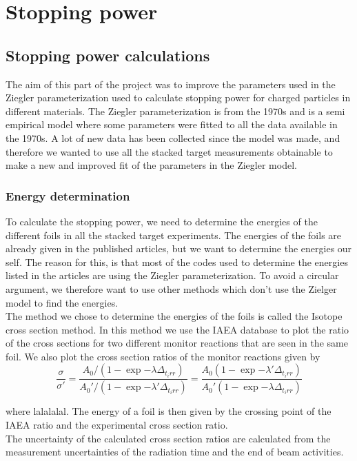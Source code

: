 \chapter{Stopping power}
\label{p1:stoppingpower}

\section{Stopping power calculations}
The aim of this part of the project was to improve the parameters used in the Ziegler parameterization used to calculate stopping power for charged particles in different materials. The Ziegler parameterization is from the 1970s and is a semi empirical model where some parameters were fitted to all the data available in the 1970s. A lot of new data has been collected since the model was made, and therefore we wanted to use all the stacked target measurements obtainable to make a new and improved fit of the parameters in the Ziegler model.  

\subsection{Energy determination}
To calculate the stopping power, we need to determine the energies of the different foils in all the stacked target experiments. The energies of the foils are already given in the published articles, but we want to determine the energies our self. The reason for this, is that most of the codes used to determine the energies listed in the articles are using the Ziegler parameterization. To avoid a circular argument, we therefore want to use other methods which don't use the Zielger model to find the energies. 
\vspace{3mm}
\\
The method we chose to determine the energies of the foils is called the Isotope cross section method. In this method we use the IAEA database to plot the ratio of the cross sections for two different monitor reactions that are seen in the same foil. We also plot the cross section ratios of the monitor reactions given by
\begin{equation}
    \frac{\sigma}{\sigma'} = \frac{A_0 / (1-\exp{-\lambda \Delta_{t_irr}})}{A_0' / (1-\exp{-\lambda' \Delta_{t_irr}})} = \frac{A_0(1-\exp{-\lambda' \Delta_{t_irr}})}{A_0' (1-\exp{-\lambda \Delta_{t_irr}})}
\end{equation}

where lalalalal.
The energy of a foil is then given by the crossing point of the IAEA ratio and the experimental cross section ratio. 
\vspace{3mm}
\\
The uncertainty of the calculated cross section ratios are calculated from the measurement uncertainties of the radiation time and the end of beam activities. 

